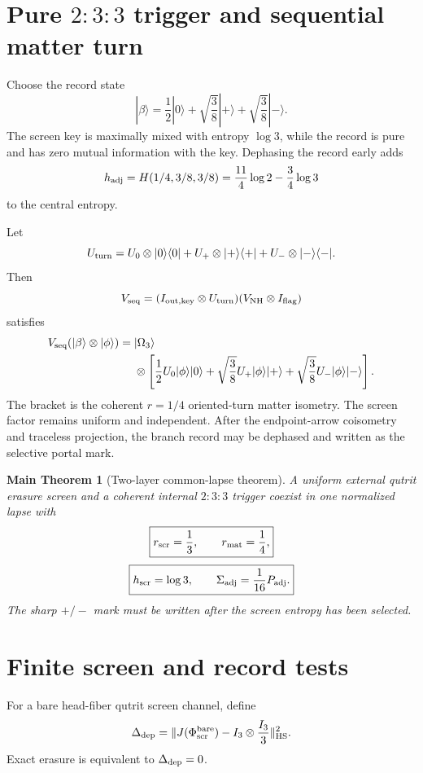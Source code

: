 \documentclass[11pt,oneside,openany]{book}
\numberwithin{equation}{chapter}
\newtheorem{maintheorem}[theorem]{Main Theorem}
\theoremstyle{definition}
\theoremstyle{remark}
\newcommand{\norm}[1]{\lVert #1\rVert}
\begin{document}
\section{Pure \texorpdfstring{\(2{:}3{:}3\)}{2:3:3} trigger and sequential matter turn}

Choose the record state
\[
 \boxed{
 |\beta\rangle
 =
 \frac12|0\rangle
 +
 \sqrt{\frac38}|+\rangle
 +
 \sqrt{\frac38}|-\rangle.}
\]
The screen key is maximally mixed with entropy \(\log3\), while the record is
pure and has zero mutual information with the key.  Dephasing the record
early adds
\[
 h_{\rm adj}
 =
 H(1/4,3/8,3/8)
 =
 \frac{11}{4}\log2-\frac34\log3
\]
to the central entropy.

Let
\[
 U_{\rm turn}
 =
 U_0\otimes|0\rangle\langle0|
 +
 U_+\otimes|+\rangle\langle+|
 +
 U_-\otimes|-\rangle\langle-|.
\]
Then
\[
 V_{\rm seq}
 =
 (I_{\rm out,key}\otimes U_{\rm turn})
 (V_{\rm NH}\otimes I_{\rm flag})
\]
satisfies
\[
 \begin{aligned}
 V_{\rm seq}(|\beta\rangle\otimes|\phi\rangle)
 ={}&
 |\Omega_3\rangle\\
 &\otimes
 \left[
 \frac12U_0|\phi\rangle|0\rangle
 +
 \sqrt{\frac38}U_+|\phi\rangle|+\rangle
 +
 \sqrt{\frac38}U_-|\phi\rangle|-\rangle
 \right].
 \end{aligned}
\]
The bracket is the coherent \(r=1/4\) oriented-turn matter isometry.  The
screen factor remains uniform and independent.  After the endpoint-arrow
coisometry and traceless projection, the branch record may be dephased and
written as the selective portal mark.

\begin{maintheorem}[Two-layer common-lapse theorem]
\label{thm:two-layer-lapse}
A uniform external qutrit erasure screen and a coherent internal
\(2{:}3{:}3\) trigger coexist in one normalized lapse with
\[
 \boxed{
 r_{\rm scr}=\frac13,
 \qquad
 r_{\rm mat}=\frac14,}
\]
\[
 \boxed{
 h_{\rm scr}=\log3,
 \qquad
 \Sigma_{\rm adj}=\frac1{16}P_{\rm adj}.}
\]
The sharp \(+\!/\!-\) mark must be written after the screen entropy has been
selected.
\end{maintheorem}

\section{Finite screen and record tests}

For a bare head-fiber qutrit screen channel, define
\[
 \Delta_{\rm dep}
 =
 \norm{
 J(\Phi_{\rm scr}^{\rm bare})
 -
 I_3\otimes\frac{I_3}{3}
 }_{\rm HS}^2.
\]
Exact erasure is equivalent to \(\Delta_{\rm dep}=0\).
\end{document}
